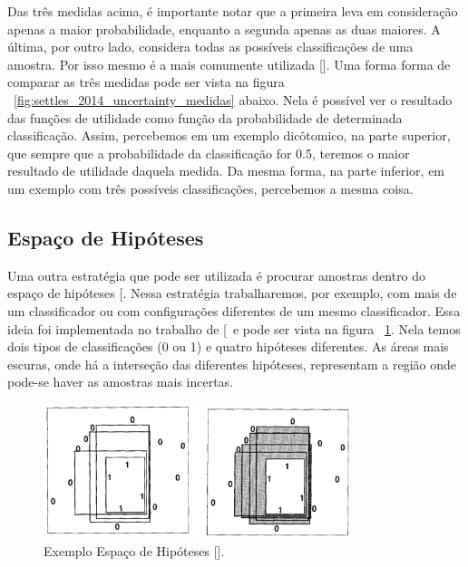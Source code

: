Das três medidas acima, é importante notar que a primeira leva em consideração apenas a maior probabilidade, enquanto a segunda apenas as duas maiores. A última, por outro lado, considera todas as possíveis classificações de uma amostra. Por isso mesmo é a mais comumente utilizada [\cite{settles2014active}]. Uma forma forma de comparar as três medidas pode ser vista na figura ~\ref{fig:settles_2014_uncertainty_medidas} abaixo. Nela é possível ver o resultado das funções de utilidade como função da probabilidade de determinada classificação. Assim, percebemos em um exemplo dicôtomico, na parte superior, que sempre que a probabilidade da classificação for 0.5, teremos o maior resultado de utilidade daquela medida. Da mesma forma, na parte inferior, em um exemplo com três possíveis classificações, percebemos a mesma coisa. 


\subsection{Espaço de Hipóteses} 
\label{sec:hypothesis_space}

Uma outra estratégia que pode ser utilizada é procurar amostras dentro do espaço de hipóteses [\cite{mitchell1978version, mitchell1982generalization}. Nessa estratégia trabalharemos, por exemplo, com mais de um classificador ou com configurações diferentes de um mesmo classificador. Essa ideia foi implementada no trabalho de [\cite{atlas1990training,cohn1994improving}\ e pode ser vista na figura ~\ref{fig:cohn_1994_hypothesis_space_example}. Nela temos dois tipos de classificações (0 ou 1) e quatro hipóteses diferentes. As áreas mais escuras, onde há a interseção das diferentes hipóteses, representam a região onde pode-se haver as amostras mais incertas. 

\begin{figure}
  \centering
  \includegraphics[width=0.8\textwidth]{figures/cohn_1994_hypothesis_space_example.png}
  \caption{Exemplo Espaço de Hipóteses [\cite{cohn1994improving}].}
  \label{fig:cohn_1994_hypothesis_space_example}
\end{figure}

